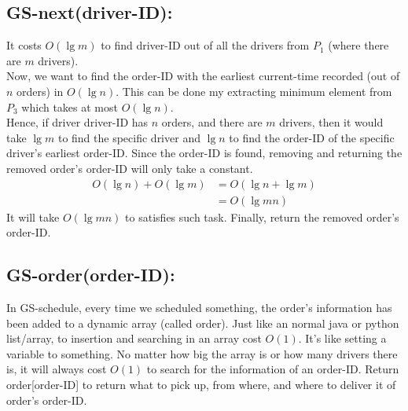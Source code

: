 \documentclass{article}
\begin{document}
\subsection*{GS-next(driver-ID):} 
It costs $O(\lg m)$ to find driver-ID out of all the drivers from $P_1$ (where there are $m$ drivers).\\
Now, we want to find the order-ID with the earliest current-time recorded (out of $n$ orders) in $O(\lg n)$. This can be done my extracting minimum element from $P_3$ which takes at most $O(\lg n)$.\\
Hence, if driver driver-ID has $n$ orders, and there are $m$ drivers, then it would take $\lg m$ to find the specific driver and $\lg n$ to find the order-ID of the specific driver's earliest order-ID. Since the order-ID is found, removing and returning the removed order's order-ID will only take a constant. 
\begin{align*}
    O(\lg n) + O(\lg m) &= O(\lg n + \lg m) \\
    &= O(\lg mn) 
\end{align*}
It will take $O(\lg mn)$ to satisfies such task. Finally, return the removed order's order-ID.

\subsection*{GS-order(order-ID):} 
In GS-schedule, every time we scheduled something, the order's information has been added to a dynamic array (called order). Just like an normal java or python list/array, to insertion and searching in an array cost $O(1)$. It's like setting a variable to something. No matter how big the array is or how many drivers there is, it will always cost $O(1)$ to search for the information of an order-ID. Return order[order-ID] to return what to pick up, from where, and where to deliver it of order's order-ID. 
\end{document}
